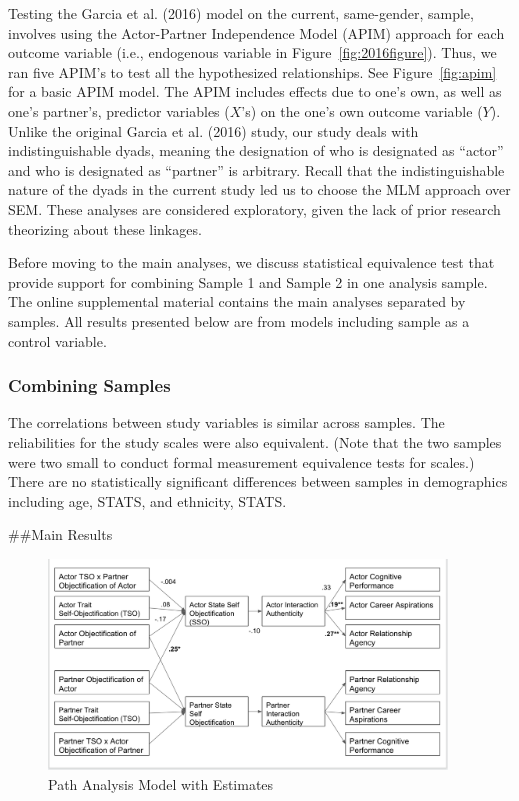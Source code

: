 \documentclass[
  man]{apa6}
\begin{document}
Testing the Garcia et al. (2016) model on the current, same-gender, sample, involves using the Actor-Partner Independence Model (APIM) approach for each outcome variable (i.e., endogenous variable in Figure~\ref{fig:2016figure}). Thus, we ran five APIM's to test all the hypothesized relationships. See Figure~\ref{fig:apim} for a basic APIM model. The APIM includes effects due to one's own, as well as one's partner's, predictor variables (\(X\)'s) on the one's own outcome variable (\(Y\)). Unlike the original Garcia et al. (2016) study, our study deals with indistinguishable dyads, meaning the designation of who is designated as \enquote{actor} and who is designated as \enquote{partner} is arbitrary. Recall that the indistinguishable nature of the dyads in the current study led us to choose the MLM approach over SEM. These analyses are considered exploratory, given the lack of prior research theorizing about these linkages.

Before moving to the main analyses, we discuss statistical equivalence test that provide support for combining Sample 1 and Sample 2 in one analysis sample. The online supplemental material contains the main analyses separated by samples. All results presented below are from models including sample as a control variable.

\hypertarget{combining-samples}{%
\subsubsection{Combining Samples}\label{combining-samples}}

The correlations between study variables is similar across samples. The reliabilities for the study scales were also equivalent. (Note that the two samples were two small to conduct formal measurement equivalence tests for scales.) There are no statistically significant differences between samples in demographics including age, STATS, and ethnicity, STATS.

\#\#Main Results

\begin{figure}
\includegraphics[width=400px]{SEMfigure} \caption{Path Analysis Model with Estimates}\label{fig:semfigure}
\end{figure}
\end{document}
